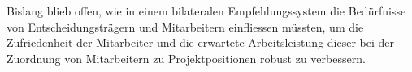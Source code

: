 Bislang blieb offen, wie in einem bilateralen Empfehlungssystem die Bedürfnisse von Entscheidungsträgern und Mitarbeitern einfliessen müssten, um die Zufriedenheit der Mitarbeiter und die erwartete Arbeitsleistung dieser bei der Zuordnung von Mitarbeitern zu Projektpositionen robust zu verbessern.






